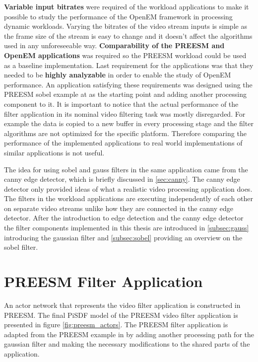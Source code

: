\textbf{Variable input bitrates} were required of the workload applications to make it possible to study the performance of the OpenEM framework in processing dynamic workloads. Varying the bitrates of the video stream inputs is simple as the frame size of the stream is easy to change and it doesn't affect the algorithms used in any unforeseeable way. \textbf{Comparability of the PREESM and OpenEM applications} was required so the PREESM workload could be used as a baseline implementation. Last requirement for the applications was that they needed to be \textbf{highly analyzable} in order to enable the study of OpenEM performance. An application satisfying these requirements was designed using the PREESM sobel example at \cite{preesmtut} as the starting point and adding another processing component to it. It is important to notice that the actual performance of the filter application in its nominal video filtering task was mostly disregarded. For example the data is copied to a new buffer in every processing stage and the filter algorithms are not optimized for the specific platform. Therefore comparing the performance of the implemented applications to real world implementations of similar applications is not useful.

The idea for using sobel and gauss filters in the same application came from the canny edge detector, which is briefly discussed in \ref{sec:canny}. The canny edge detector only provided ideas of what a realistic video processing application does. The filters in the workload applications are executing independently of each other on separate video streams unlike how they are connected in the canny edge detector. After the introduction to edge detection and the canny edge detector the filter components implemented in this thesis are introduced in \ref{subsec:gauss} introducing the gaussian filter and \ref{subsec:sobel} providing an overview on the sobel filter.

\section{PREESM Filter Application}
\label{sec:preesmapp}
An actor network that represents the video filter application is constructed in PREESM. The final PiSDF model of the PREESM video filter application is presented in figure \ref{fig:preesm_actors}. The PREESM filter application is adapted from the PREESM example in \cite{preesmtut} by adding another processing path for the gaussian filter and making the necessary modifications to the shared parts of the application.

